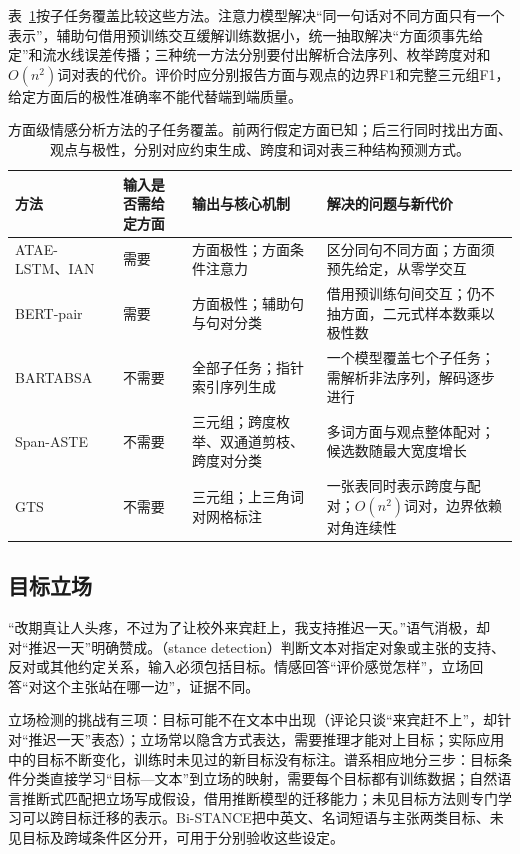 表~\ref{tab:nlp-classification-absa}按子任务覆盖比较这些方法。注意力模型解决“同一句话对不同方面只有一个表示”，辅助句借用预训练交互缓解训练数据小，统一抽取解决“方面须事先给定”和流水线误差传播；三种统一方法分别要付出解析合法序列、枚举跨度对和$O(n^2)$词对表的代价。评价时应分别报告方面与观点的边界F1和完整三元组F1，给定方面后的极性准确率不能代替端到端质量。

\begin{table}[htbp]
  \centering
  \small
  \begin{tabularx}{\linewidth}{@{}>{\raggedright\arraybackslash}p{24mm}
    >{\raggedright\arraybackslash}p{24mm}>{\raggedright\arraybackslash}X
    >{\raggedright\arraybackslash}X@{}}
    \toprule
    方法 & 输入是否需给定方面 & 输出与核心机制 & 解决的问题与新代价 \\
    \midrule
    ATAE-LSTM、IAN & 需要 & 方面极性；方面条件注意力 & 区分同句不同方面；方面须预先给定，从零学交互 \\
    BERT-pair & 需要 & 方面极性；辅助句与句对分类 & 借用预训练句间交互；仍不抽方面，二元式样本数乘以极性数 \\
    BARTABSA & 不需要 & 全部子任务；指针索引序列生成 & 一个模型覆盖七个子任务；需解析非法序列，解码逐步进行 \\
    Span-ASTE & 不需要 & 三元组；跨度枚举、双通道剪枝、跨度对分类 & 多词方面与观点整体配对；候选数随最大宽度增长 \\
    GTS & 不需要 & 三元组；上三角词对网格标注 & 一张表同时表示跨度与配对；$O(n^2)$词对，边界依赖对角连续性 \\
    \bottomrule
  \end{tabularx}
  \caption{方面级情感分析方法的子任务覆盖。前两行假定方面已知；后三行同时找出方面、观点与极性，分别对应约束生成、跨度和词对表三种结构预测方式。}
  \label{tab:nlp-classification-absa}
\end{table}

\subsection{目标立场}
\label{sec:nlp-classification-stance}

“改期真让人头疼，不过为了让校外来宾赶上，我支持推迟一天。”语气消极，却对“推迟一天”明确赞成。（stance detection）判断文本对指定对象或主张的支持、反对或其他约定关系，输入必须包括目标。情感回答“评价感觉怎样”，立场回答“对这个主张站在哪一边”，证据不同。

立场检测的挑战有三项：目标可能不在文本中出现（评论只谈“来宾赶不上”，却针对“推迟一天”表态）；立场常以隐含方式表达，需要推理才能对上目标；实际应用中的目标不断变化，训练时未见过的新目标没有标注。谱系相应地分三步：目标条件分类直接学习“目标—文本”到立场的映射，需要每个目标都有训练数据；自然语言推断式匹配把立场写成假设，借用推断模型的迁移能力；未见目标方法则专门学习可以跨目标迁移的表示。Bi-STANCE把中英文、名词短语与主张两类目标、未见目标及跨域条件区分开，可用于分别验收这些设定。

